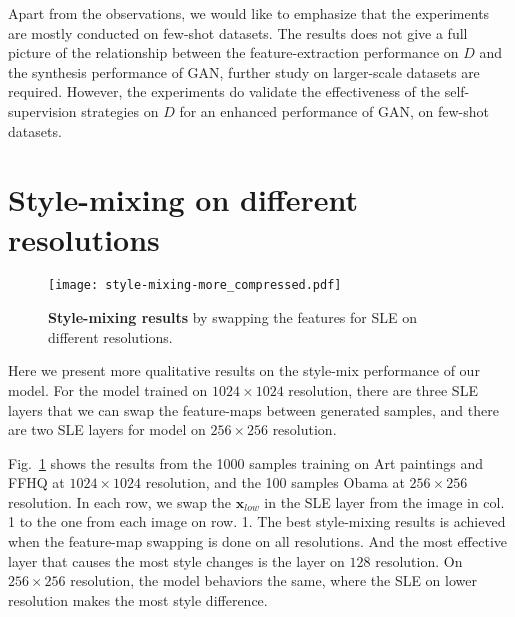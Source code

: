 \documentclass{article} \usepackage{iclr2021_conference,times}
\begin{document}
Apart from the observations, we would like to emphasize that the experiments are mostly conducted on few-shot datasets. The results does not give a full picture of the relationship between the feature-extraction performance on $D$ and the synthesis performance of GAN, further study on larger-scale datasets are required. However, the experiments do validate the effectiveness of the self-supervision strategies on $D$ for an enhanced performance of GAN, on few-shot datasets. 


\section{Style-mixing on different resolutions}

\begin{figure}[h]
\vspace{-2mm}
\centering
\texttt{[image: style-mixing-more\_compressed.pdf]}
\caption{\textbf{Style-mixing results} by swapping the features for SLE on different resolutions.}
\label{fig:style-mixing-multilayer}
\end{figure}

Here we present more qualitative results on the style-mix performance of our model. For the model trained on $1024\times1024$ resolution, there are three SLE layers that we can swap the feature-maps between generated samples, and there are two SLE layers for model on $256\times256$ resolution. 

Fig.~\ref{fig:style-mixing-multilayer} shows the results from the 1000 samples training on Art paintings and FFHQ at $1024\times1024$ resolution, and the 100 samples Obama at $256\times256$ resolution. In each row, we swap the $\mathbf{x}_{low}$ in the SLE layer from the image in col. 1 to the one from each image on row. 1. The best style-mixing results is achieved when the feature-map swapping is done on all resolutions. And the most effective layer that causes the most style changes is the layer on $128$ resolution. On $256\times256$ resolution, the model behaviors the same, where the SLE on lower resolution makes the most style difference.
\end{document}
